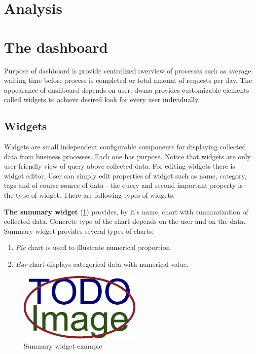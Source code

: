     \section{Analysis}    

   

	\section{The dashboard}
    Purpose of dashboard is provide centralized overview of processes such as average waiting time before process is completed or total amount of requests per day. The appearance of dashboard depends on user. \gls{dwma} provides customizable elements called widgets to achieve desired look for every user individually.

    \subsection{Widgets}  
     Widgets are small independent configurable components for displaying collected data from business processes. Each one has purpose. Notice that widgets are only user-friendly view of query above collected data. For editing widgets there is widget editor. User can simply edit properties of widget such as name, category, tags and of course source of data - the query and second important property is the type of widget. There are following types of widgets:
     
     \textbf{The summary widget} (\cref{fig:widget-summary}) provides, by it's name, chart with summarization of collected data. Concrete type of the chart depends on the user and on the data. Summary widget provides several types of charts:
     
     \begin{enumerate}
    	\item \textit{Pie} chart is used to illustrate numerical proportion.         
        \item  \textit{Bar} chart displays categorical data with numerical value.
    \end{enumerate}
      
      \begin{figure}[ht!]
          \centering
          \includegraphics[width=6cm,keepaspectratio]{img/TODO-image}
          \caption{Summary widget example}
          \label{fig:widget-summary}
      \end{figure}   
    
